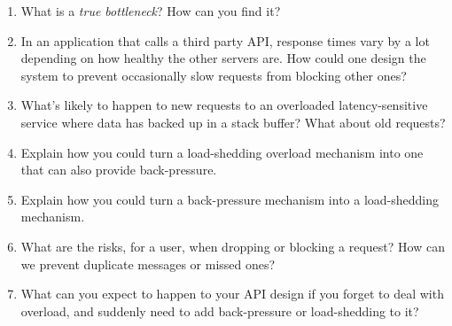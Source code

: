 \documentclass[11pt, oneside]{book}   	%
\begin{document}
\begin{enumerate}
	\item What is a \emph{true bottleneck}? How can you find it?
	\item In an application that calls a third party API, response times vary by a lot depending on how healthy the other servers are. How could one design the system to prevent occasionally slow requests from blocking other ones?
	\item What's likely to happen to new requests to an overloaded latency-sensitive service where data has backed up in a stack buffer? What about old requests?
	\item Explain how you could turn a load-shedding overload mechanism into one that can also provide back-pressure.
	\item Explain how you could turn a back-pressure mechanism into a load-shedding mechanism. 
	\item What are the risks, for a user, when dropping or blocking a request? How can we prevent duplicate messages or missed ones?
	\item What can you expect to happen to your API design if you forget to deal with overload, and suddenly need to add back-pressure or load-shedding to it?
\end{enumerate}
\end{document}
